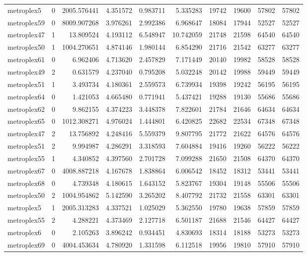 \begin{longtable}{|l|r|r|r|r|r|r|r|r|r|}
metroplex5 & 0 & 2005.576441 & 4.351572 & 0.983711 & 5.335283 & 19742 & 19600 & 57802 & 57802 \\
metroplex59 & 0 & 8009.907268 & 3.976261 & 2.992386 & 6.968647 & 18084 & 17944 & 52527 & 52527 \\
metroplex47 & 1 & 13.809524 & 4.193112 & 6.548947 & 10.742059 & 21748 & 21598 & 64540 & 64540 \\
metroplex50 & 1 & 1004.270651 & 4.874146 & 1.980144 & 6.854290 & 21716 & 21542 & 63277 & 63277 \\
metroplex61 & 0 & 6.962406 & 4.713620 & 2.457829 & 7.171449 & 20140 & 19982 & 58528 & 58528 \\
metroplex49 & 2 & 0.631579 & 4.237040 & 0.795208 & 5.032248 & 20142 & 19988 & 59449 & 59449 \\
metroplex51 & 1 & 3.493734 & 4.180361 & 2.559573 & 6.739934 & 19398 & 19242 & 56195 & 56195 \\
metroplex64 & 0 & 1.421053 & 4.665480 & 0.771941 & 5.437421 & 19288 & 19130 & 55686 & 55686 \\
metroplex62 & 0 & 9.862155 & 4.374223 & 3.448378 & 7.822601 & 21784 & 21646 & 64634 & 64634 \\
metroplex65 & 0 & 1012.308271 & 4.976024 & 1.444801 & 6.420825 & 22682 & 22534 & 67348 & 67348 \\
metroplex47 & 2 & 13.756892 & 4.248416 & 5.559379 & 9.807795 & 21772 & 21622 & 64576 & 64576 \\
metroplex51 & 2 & 9.994987 & 4.286291 & 3.318593 & 7.604884 & 19416 & 19260 & 56222 & 56222 \\
metroplex55 & 1 & 4.340852 & 4.397560 & 2.701728 & 7.099288 & 21650 & 21508 & 64370 & 64370 \\
metroplex67 & 0 & 4008.887218 & 4.167678 & 1.838864 & 6.006542 & 18452 & 18312 & 53441 & 53441 \\
metroplex68 & 0 & 4.739348 & 4.180615 & 1.643152 & 5.823767 & 19304 & 19148 & 55506 & 55506 \\
metroplex50 & 2 & 1004.954862 & 5.142590 & 3.265202 & 8.407792 & 21732 & 21558 & 63301 & 63301 \\
metroplex5 & 1 & 2005.313283 & 4.337521 & 1.025029 & 5.362550 & 19780 & 19638 & 57859 & 57859 \\
metroplex55 & 2 & 4.288221 & 4.373469 & 2.127718 & 6.501187 & 21688 & 21546 & 64427 & 64427 \\
metroplex6 & 0 & 2.105263 & 3.896242 & 0.934451 & 4.830693 & 18314 & 18188 & 53273 & 53273 \\
metroplex69 & 0 & 4004.453634 & 4.780920 & 1.331598 & 6.112518 & 19956 & 19810 & 57910 & 57910 \\

\end{longtable}
